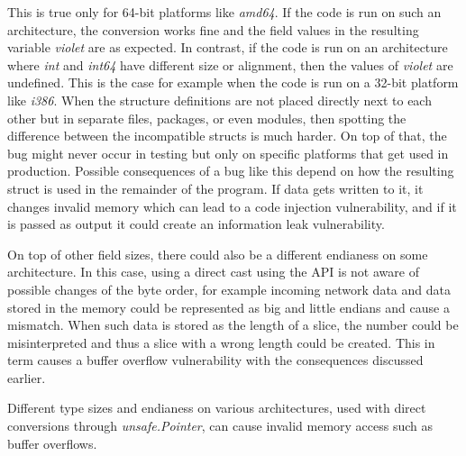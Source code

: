 This is true only for 64-bit platforms like \textit{amd64}.
If the code is run on such an architecture, the conversion works fine and the field values in the resulting variable
\textit{violet} are as expected.
In contrast, if the code is run on an architecture where \textit{int} and \textit{int64} have different size or
alignment, then the values of \textit{violet} are undefined.
This is the case for example when the code is run on a 32-bit platform like \textit{i386}.
When the structure definitions are not placed directly next to each other but in separate files, packages, or even
modules, then spotting the difference between the incompatible structs is much harder.
On top of that, the bug might never occur in testing but only on specific platforms that get used in production.
Possible consequences of a bug like this depend on how the resulting struct is used in the remainder of the program.
If data gets written to it, it changes invalid memory which can lead to a code injection vulnerability, and if it is
passed as output it could create an information leak vulnerability.

On top of other field sizes, there could also be a different endianess on some architecture.
In this case, using a direct cast using the \unsafe{} \acrshort{API} is not aware of possible changes of the byte order,
for example incoming network data and data stored in the memory could be represented as big and little endians and cause
a mismatch.
When such data is stored as the length of a slice, the number could be misinterpreted and thus a slice with a wrong
length could be created.
This in term causes a buffer overflow vulnerability with the consequences discussed earlier.

\begin{insight}
    Different type sizes and endianess on various architectures, used with direct conversions through
    \textit{unsafe.Pointer}, can cause invalid memory access such as buffer overflows.
\end{insight}
